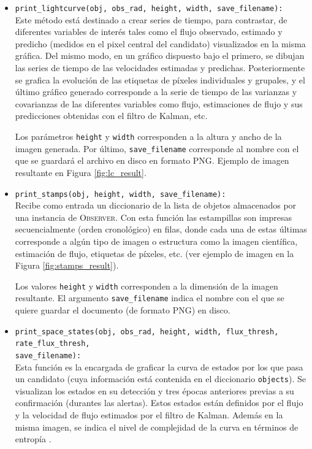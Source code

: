 \begin{itemize}
\item \texttt{print\_lightcurve(obj, obs\_rad, height, width, save\_filename):}\\
Este m\'etodo est\'a destinado a crear series de tiempo, para contrastar, de diferentes variables de inter\'es tales como el flujo observado, estimado y predicho (medidos en el pixel central del candidato) visualizados en la misma gr\'afica. Del mismo modo, en un gr\'afico dispuesto bajo el primero, se dibujan las series de tiempo de las velocidades estimadas y predichas. Posteriormente se grafica la evoluci\'on de las etiquetas de p\'ixeles individuales y grupales, y el \'ultimo gr\'afico generado corresponde a la serie de tiempo de las varianzas y covarianzas de las diferentes variables como flujo, estimaciones de flujo y sus predicciones obtenidas con el filtro de Kalman, etc.
\bigskip

 Los par\'ametros \texttt{height} y \texttt{width} corresponden a la altura y ancho de la imagen generada. Por \'ultimo, \texttt{save\_filename} corresponde al nombre con el que se guardar\'a el archivo en disco en formato PNG. Ejemplo de imagen resultante en Figura \ref{fig:lc_result}.
 
\item \texttt{print\_stamps(obj, height, width, save\_filename):}\\
Recibe como entrada un diccionario de la lista de objetos almacenados por una instancia de \textsc{Observer}. Con esta funci\'on las estampillas son impresas secuencialmente (orden cronol\'ogico) en filas, donde cada una de estas \'ultimas corresponde a alg\'un tipo de imagen o estructura como la imagen cient\'ifica, estimaci\'on de flujo, etiquetas de p\'ixeles, etc. (ver ejemplo de imagen en la Figura \ref{fig:stamps_result}).
\bigskip

Los valores \texttt{height} y \texttt{width} corresponden a la dimensi\'on de la imagen resultante. El argumento \texttt{save\_filename} indica el nombre con el que se quiere guardar el documento (de formato PNG) en disco. 

\item \texttt{print\_space\_states(obj, obs\_rad, height, width, flux\_thresh, rate\_flux\_thresh,}\\
\texttt{save\_filename):}\\
Esta funci\'on es la encargada de graficar la curva de estados por los que pasa un candidato (cuya informaci\'on est\'a contenida en el diccionario \texttt{objects}). Se visualizan los estados en su detecci\'on y tres \'epocas anteriores previas a su confirmaci\'on (durantes las alertas). Estos estados est\'an definidos por el flujo y la velocidad de flujo estimados por el filtro de Kalman. Adem\'as en la misma imagen, se indica el nivel de complejidad de la curva en t\'erminos de entrop\'ia \cite{balestrino}.
\bigskip


\end{itemize}
